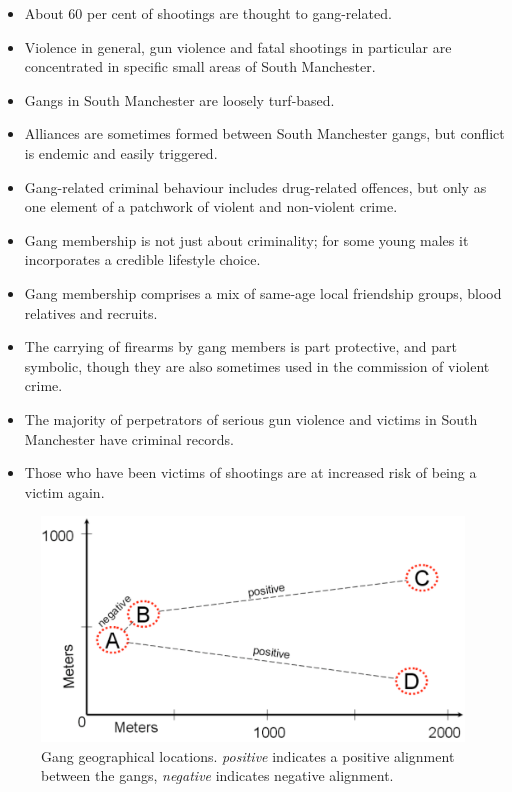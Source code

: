 \documentclass[twocolumn]{svjour3}          %
\theoremstyle{definition}
\begin{document}
\begin{itemize}
\item About 60 per cent of shootings are thought to gang-related.
\item Violence in general, gun violence and fatal shootings in
particular are concentrated in specific small areas of South
Manchester.
\item Gangs in South Manchester are loosely turf-based.
\item Alliances are sometimes formed between South Manchester gangs,
but conflict is endemic and easily triggered.
\item Gang-related criminal behaviour includes drug-related offences,
but only as one element of a patchwork of violent and non-violent
crime.
\item Gang membership is not just about criminality; for some young
males it incorporates a credible lifestyle choice.
\item Gang membership comprises a mix of same-age local friendship
groups, blood relatives and recruits.
\item The carrying of firearms by gang members is part protective, and
part symbolic, though they are also sometimes used in the commission
of violent crime.
\item The majority of perpetrators of serious gun violence and victims
in South Manchester have criminal records.
\item Those who have been victims of shootings are at increased risk
of being a victim again.
\end{itemize}

\begin{figure}[!ht]
\centering
\includegraphics[width=\columnwidth]{images/positive}
\caption{Gang geographical locations. \emph{positive} indicates a positive alignment between the gangs, \emph{negative} indicates negative alignment.}
\label{fig:positive} 
\end{figure}
\end{document}
